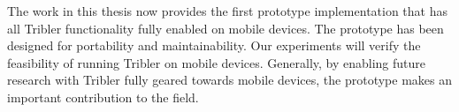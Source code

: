 The work in this thesis now provides the first prototype implementation that has all Tribler functionality fully enabled on mobile devices.
The prototype has been designed for portability and maintainability.
Our experiments will verify the feasibility of running Tribler on mobile devices.
Generally, by enabling future research with Tribler fully geared towards mobile devices, the prototype makes an important contribution to the field.


